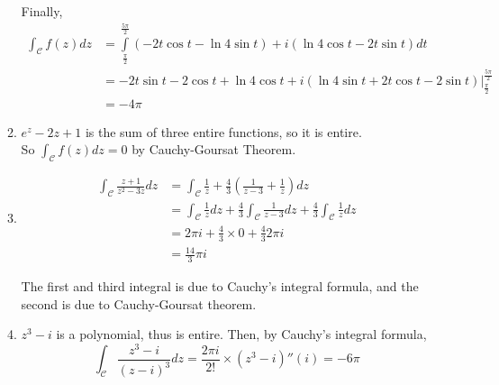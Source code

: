 \documentclass[12pt]{article}
\newcommand{\curve}{\mathcal{C}}
\newcommand{\integral}{\int\limits}
\begin{document}
\begin{enumerate}
\begin{enumerate}
        Finally, 
        \begin{align*}
            \int_\curve f(z)dz &= \integral^{\frac{5\pi}{2}}_{\frac{\pi}{2}}  (-2t\cos t - \ln4 \sin t )+ i(\ln4 \cos t - 2t\sin t) dt\\
            & =\left. -2t\sin t -2\cos t + \ln4 \cos t + i (\ln4 \sin t + 2t\cos t - 2\sin t) \right\vert ^{\frac{5\pi}{2}}_{\frac{\pi}{2}}\\
            &= -4\pi
        \end{align*}
        \pagebreak
        \item $e^z-2z+ 1$ is the sum of three entire functions, so it is entire. \\So $\int_\curve f(z)dz = 0$ by Cauchy-Goursat Theorem.
        \item \begin{align*}
        \int_\curve \frac{z+1}{z^2-3z}dz &= \int_\curve \frac{1}{z} + \frac{4}{3} \left(\frac{1}{z-3} + \frac{1}{z}\right) dz \\
        &= \int_\curve \frac{1}{z}dz + \frac{4}{3} \int_\curve \frac{1}{z-3} dz + \frac{4}{3}\int_\curve \frac{1}{z} dz\\
        &= 2\pi i + \frac{4}{3} \times 0 + \frac{4}{3} 2\pi i \\
        &= \frac{14}{3} \pi i
        \end{align*}

        The first and third integral is due to Cauchy's integral formula, and the second is due to Cauchy-Goursat theorem.
    
    \item $z^3- i$ is a polynomial, thus is entire. Then, by Cauchy's integral formula,  $$\int_\curve \frac{z^3-i}{(z-i)^3}dz = \frac{2\pi i}{2!}\times (z^3 - i)''(i) = -6\pi$$
    \end{enumerate}
    
\end{enumerate}
\end{document}
